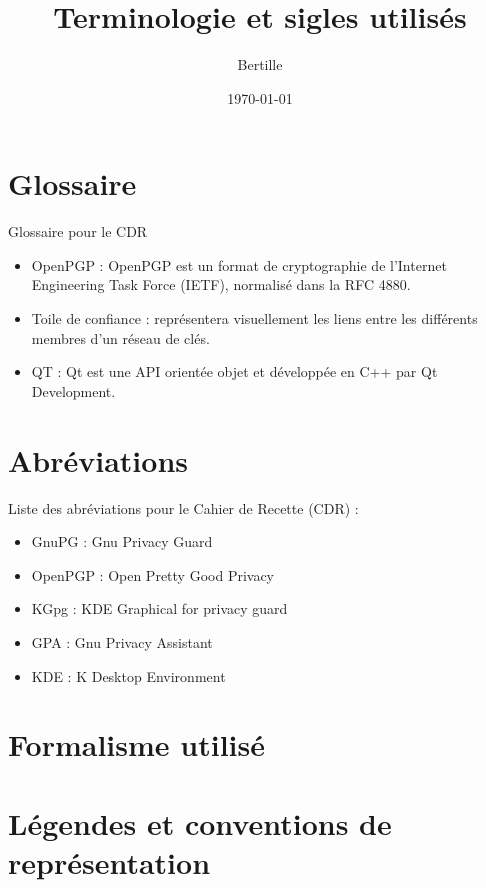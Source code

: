 \documentclass{../res/univ-projet}
\title{Terminologie et sigles utilisés}
\author{Bertille \bsc{Bouillie}}
\date{\today}
\begin{document}
\maketitle
\newpage
\tableofcontents
\newpage


\section{Glossaire}

Glossaire pour le CDR

\begin{itemize}
 \item OpenPGP : OpenPGP est un format de cryptographie de l'Internet Engineering Task Force (IETF), normalisé dans la RFC 4880.
 \item Toile de confiance : représentera visuellement les liens entre les différents membres d'un réseau de clés.
 \item QT : Qt est une API orientée objet et développée en C++ par Qt Development.
\end{itemize}



\section{Abréviations}

	
Liste des abréviations pour le Cahier de Recette (CDR) :

\begin{itemize}
 \item GnuPG : Gnu Privacy Guard
 \item OpenPGP : Open Pretty Good Privacy
 \item KGpg : KDE Graphical for privacy guard
 \item GPA : Gnu Privacy Assistant
 \item KDE : K Desktop Environment
\end{itemize}



\section{Formalisme utilisé}

\begin{description}
 \item 
\end{description}



\section{Légendes et conventions de représentation}

\begin{description}
 \item 
\end{description}
\end{document}
